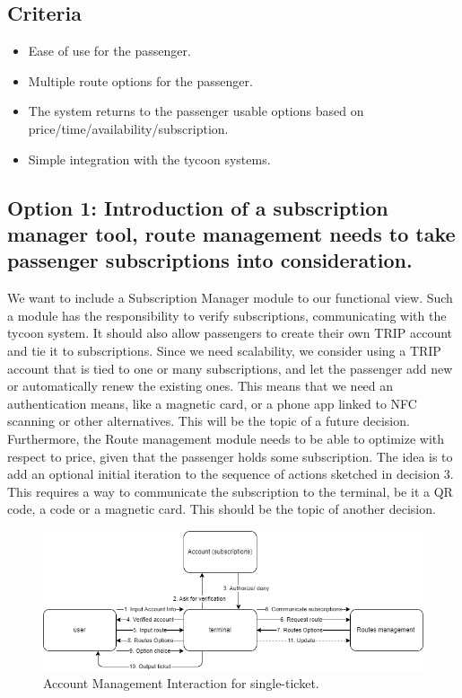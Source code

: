\subsection*{Criteria}
\begin{itemize}
\item Ease of use for the passenger.
\item Multiple route options for the passenger.
\item The system returns to the passenger usable options based on price/time/availability/subscription.
\item Simple integration with the tycoon systems.
\end{itemize}

\subsection*{Option 1: Introduction of a subscription manager tool, route management needs to take passenger subscriptions into consideration.}
We want to include a Subscription Manager module to our functional view. 
Such a module has the responsibility to verify subscriptions, communicating with the tycoon system.
It should also allow passengers to create their own TRIP account and tie it to subscriptions.
Since we need scalability, we consider using a TRIP account that is tied to one or many subscriptions, and let the passenger add new or automatically renew the existing ones.
This means that we need an authentication means, like a magnetic card, or a phone app linked to NFC scanning or other alternatives.
This will be the topic of a future decision.
Furthermore, the Route management module needs to be able to optimize with respect to price, given that the passenger holds some subscription.
The idea is to add an optional initial iteration to the sequence of actions sketched in decision 3.
This requires a way to communicate the subscription to the terminal, be it a QR code, a code or a magnetic card. 
This should be the topic of another decision.
\begin{figure}[ht]
    \centering
    \includegraphics[width=\textwidth]{drawings/decision4_drawings/account_functional.png}
    \caption{Account Management Interaction for single-ticket.}
    \label{fig:account_management_ticket}
\end{figure}
